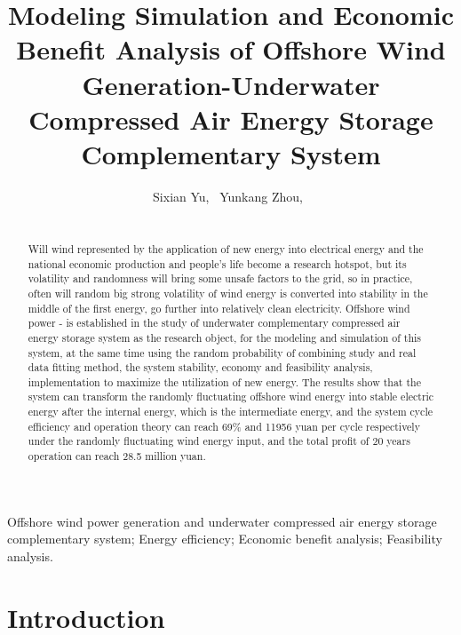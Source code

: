 \documentclass[journal,onecolumn]{IEEEtran}
\begin{document}
\title{Modeling Simulation and Economic Benefit Analysis of Offshore Wind Generation-Underwater Compressed Air Energy Storage Complementary System}
\author{Sixian Yu,~
        Yunkang Zhou,~
        }
\maketitle

\begin{abstract}\ \\

Will wind represented by the application of new energy into electrical energy and the national economic production and people's life become a research hotspot, but its volatility and randomness will bring some unsafe factors to the grid, so in practice, often will random big strong volatility of wind energy is converted into stability in the middle of the first energy, go further into relatively clean electricity. Offshore wind power - is established in the study of underwater complementary compressed air energy storage system as the research object, for the modeling and simulation of this system, at the same time using the random probability of combining study and real data fitting method, the system stability, economy and feasibility analysis, implementation to maximize the utilization of new energy. The results show that the system can transform the randomly fluctuating offshore wind energy into stable electric energy after the internal energy, which is the intermediate energy, and the system cycle efficiency and operation theory can reach 69\% and 11956 yuan per cycle respectively under the randomly fluctuating wind energy input, and the total profit of 20 years operation can reach 28.5 million yuan.\\

\end{abstract}

\begin{IEEEkeywords}
Offshore wind power generation and underwater compressed air energy storage complementary system; Energy efficiency; Economic benefit analysis; Feasibility analysis.

\end{IEEEkeywords}
\IEEEpeerreviewmaketitle
\section{Introduction}\ \\
\end{document}
